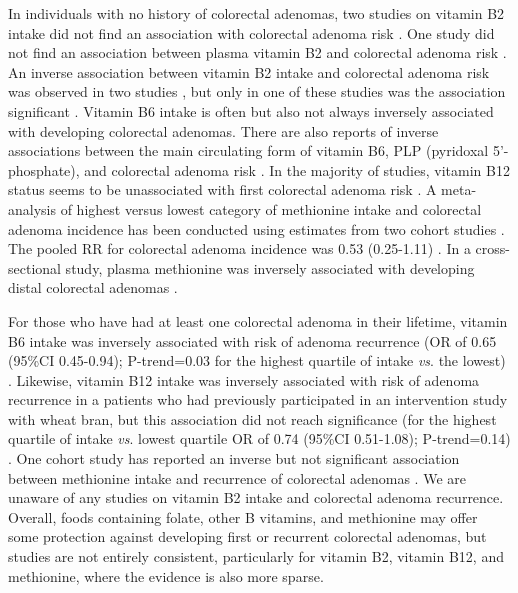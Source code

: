 \noindent In individuals with no history of colorectal adenomas, two studies on vitamin B2 intake did not find an association with colorectal adenoma risk \cite{c153,c154}. One study did not find an association between plasma vitamin B2 and colorectal adenoma risk \cite{c155}. An inverse association between vitamin B2 intake and colorectal adenoma risk was observed in two studies \cite{c156,c157}, but only in one of these studies was the association significant \cite{c156}. Vitamin B6 intake is often \cite{c147,c153} but also not always \cite{c156} inversely associated with developing colorectal adenomas. There are also reports of inverse associations between the main circulating form of vitamin B6, PLP (pyridoxal 5'-phosphate), and colorectal adenoma risk \cite{c155,c158}. In the majority of studies, vitamin B12 status seems to be unassociated with first colorectal adenoma risk \cite{c155,c156,c158}. A meta-analysis of highest versus lowest category of methionine intake and colorectal adenoma incidence has 
been conducted using estimates from two cohort studies \cite{c146}. The pooled RR for colorectal adenoma incidence was 0.53 (0.25-1.11) \cite{c146}. In a cross-sectional study, plasma methionine was inversely associated with developing distal colorectal adenomas \cite{c155}. 
 
\noindent For those who have had at least one colorectal adenoma in their lifetime, vitamin B6 intake was inversely associated with risk of adenoma recurrence (OR of 0.65 (95\%CI 0.45-0.94); P-trend=0.03 for the highest quartile of intake \textit{vs}. the lowest) \cite{c147}. Likewise, vitamin B12 intake was inversely associated with risk of adenoma recurrence in a patients who had previously participated in an intervention study with wheat bran, but this association did not reach significance (for the highest quartile of intake \textit{vs}. lowest quartile OR of 0.74 (95\%CI 0.51-1.08); P-trend=0.14) \cite{c147}. One cohort study has reported an inverse but not significant association between methionine intake and recurrence of colorectal adenomas \cite{c147}. We are unaware of any studies on vitamin B2 intake and colorectal adenoma recurrence. Overall, foods containing folate, other B vitamins, and methionine may offer some protection against developing first or recurrent colorectal adenomas, but studies 
are not entirely consistent, particularly for vitamin B2, vitamin B12, and methionine, where the evidence is also more sparse. 
 
